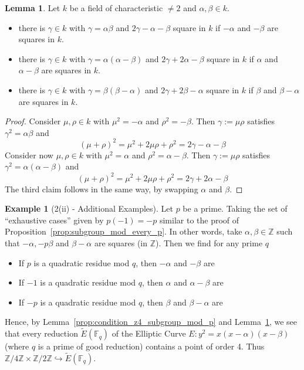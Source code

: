 \documentclass{scrartcl}
\newcommand{\Z}{\mathbb{Z}}
\newcommand{\F}{\mathbb{F}}
\theoremstyle{definition}
\newtheorem{lemma}[subsection]{Lemma}
\newtheorem{example}[subsection]{Example}
\begin{document}
\begin{lemma}
    \label{prop:condition_double_square}
    Let $k$ be a field of characteristic $\neq 2$ and $\alpha, \beta \in k$.
    \begin{itemize}
        \item there is $\gamma \in k$ with $\gamma = \alpha\beta$ and $2\gamma - \alpha - \beta$ square in $k$ if $-\alpha$ and $-\beta$ are squares in $k$.
        \item there is $\gamma \in k$ with $\gamma = \alpha(\alpha - \beta)$ and $2\gamma + 2\alpha - \beta$ square in $k$ if $\alpha$ and $\alpha - \beta$ are squares in $k$.
        \item there is $\gamma \in k$ with $\gamma = \beta(\beta - \alpha)$ and $2\gamma + 2\beta - \alpha$ square in $k$ if $\beta$ and $\beta - \alpha$ are squares in $k$.
    \end{itemize}
\end{lemma}
\begin{proof}
    Consider $\mu, \rho \in k$ with $\mu^2 = -\alpha$ and $\rho^2 = -\beta$.
    Then $\gamma := \mu\rho$ satisfies $\gamma^2 = \alpha\beta$ and
    \begin{equation*}
        (\mu + \rho)^2 = \mu^2 + 2\mu\rho + \rho^2 = 2\gamma -\alpha - \beta
    \end{equation*}
    Consider now $\mu, \rho \in k$ with $\mu^2 = \alpha$ and $\rho^2 = \alpha - \beta$.
    Then $\gamma := \mu\rho$ satisfies $\gamma^2 = \alpha(\alpha - \beta)$ and
    \begin{equation*}
        (\mu + \rho)^2 = \mu^2 + 2\mu\rho + \rho^2 = 2\gamma + 2\alpha - \beta
    \end{equation*}
    The third claim follows in the same way, by swapping $\alpha$ and $\beta$.
\end{proof}
\begin{example}[2(ii) - Additional Examples]
    Let $p$ be a prime.
    Taking the set of ``exhaustive cases'' given by $p(-1) = -p$ similar to the proof of Proposition~\ref{prop:subgroup_mod_every_p}.
    In other words, take $\alpha, \beta \in \Z$ such that $-\alpha, -p\beta$ and $\beta - \alpha$ are squares (in $\Z$).
    Then we find for any prime $q$
    \begin{itemize}
        \item If $p$ is a quadratic residue mod $q$, then $-\alpha$ and $-\beta$ are
        \item If $-1$ is a quadratic residue mod $q$, then $\alpha$ and $\alpha - \beta$ are
        \item If $-p$ is a quadratic residue mod $q$, then $\beta$ and $\beta - \alpha$ are
    \end{itemize}
    Hence, by Lemma~\ref{prop:condition_z4_subgroup_mod_p} and Lemma~\ref{prop:condition_double_square}, we see that every reduction $\tilde{E}(\F_q)$ of the Elliptic Curve $E: y^2 = x(x - \alpha)(x - \beta)$ (where $q$ is a prime of good reduction) contains a point of order 4.
    Thus $\Z/4\Z \times \Z/2\Z \hookrightarrow \tilde{E}(\F_q)$.
\end{example}
\end{document}
